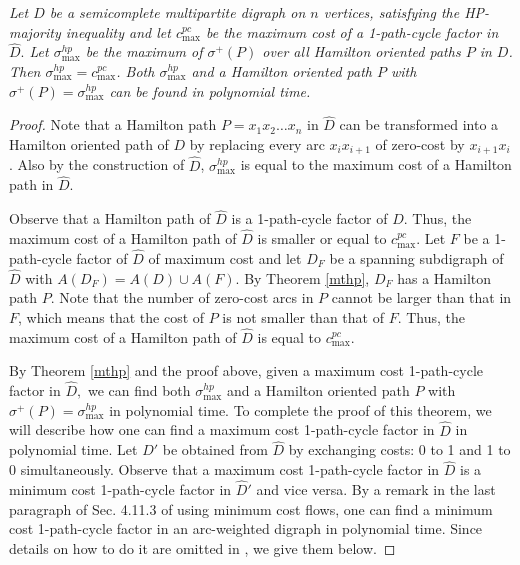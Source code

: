 \documentclass{article}
\newcommand{\GGn}[1]{{#1}}
\newcommand{\GGnn}[1]{{#1}}
\newcommand{\2}{\vspace{0.2cm}}
\begin{document}
    \textit{Let $D$ be a semicomplete multipartite digraph on $n$ vertices, satisfying the HP-majority inequality and let $c^{pc}_{\max}$ be the maximum cost of a 1-path-cycle factor in $\hat{D}.$
Let $\sigma^{hp}_{\max}$ be \GGnn{the maximum of $\sigma^+(P)$ over all Hamilton oriented paths} $P$ in $D$.
Then $\sigma^{hp}_{\max}=c^{pc}_{\max}$. Both $\sigma^{hp}_{\max}$ and a Hamilton oriented path $P$ with  \GGnn{$\sigma^+(P)=\sigma^{hp}_{\max}$}
can be found in polynomial time. }
\begin{proof}
Note that a Hamilton path $P=x_1x_2\dots x_n$ in $\hat{D}$ can be transformed into a Hamilton oriented path of $D$ by replacing every arc $x_ix_{i+1}$ of zero-cost by $x_{i+1}x_i$.
Also by the construction of $\hat{D}$, $\sigma^{hp}_{\max}$ is equal to the maximum cost of a Hamilton path in $\hat{D}.$


Observe that a Hamilton path of $\hat{D}$ is a 1-path-cycle factor of $\hat{D}$. Thus, the maximum cost of a Hamilton path of $\hat{D}$ is smaller or equal to $c^{pc}_{\max}.$
 Let $F$ be a 1-path-cycle factor of $\hat{D}$ of maximum cost and let $D_F$ be a spanning subdigraph of $\hat{D}$ with $A(D_F)=A(D)\cup A(F).$
 By Theorem \ref{mthp}, $D_F$ has a Hamilton path $P$. Note that the number of zero-cost arcs in $P$ cannot be larger than that in $F$, which means that the cost of $P$
 is not smaller than that of $F$. Thus,  the maximum cost of a Hamilton path of $\hat{D}$ is equal to $c^{pc}_{\max}$.  %

By Theorem \ref{mthp} and the proof above, given a maximum cost 1-path-cycle factor in $\hat{D},$ we can find both $\sigma^{hp}_{\max}$ and a Hamilton oriented path $P$ with  \GGnn{$\sigma^+(P)=\sigma^{hp}_{\max}$} in polynomial time. To complete the proof of this theorem, we will describe how one can find  a maximum cost 1-path-cycle factor in $\hat{D}$ in polynomial time. Let $\hat{D}'$ be obtained from $\hat{D}$ by exchanging costs: 0 to 1 and 1 to 0 simultaneously. Observe that a maximum cost 1-path-cycle factor in $\hat{D}$ is a minimum cost 1-path-cycle factor in $\hat{D}'$ and vice versa. \GGn{By a remark in the last paragraph of Sec. 4.11.3 of \cite{BG00} using minimum cost flows, one can find a minimum cost 1-path-cycle factor in an arc-weighted digraph in polynomial time. Since details on how to do it are omitted in \cite{BG00}, we give them below.}


\end{proof}
\end{document}
